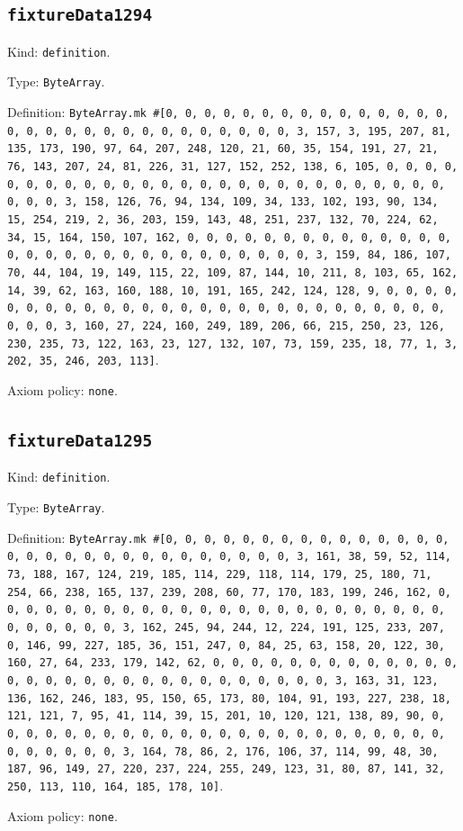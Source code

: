 \documentclass[11pt]{article}
\begin{document}
\subsection*{\texttt{fixtureData1294}}
\noindent Kind: \texttt{definition}.\par
\noindent Type: \texttt{ByteArray}.\par
\noindent Definition: \texttt{ByteArray.mk \#[0, 0, 0, 0, 0, 0, 0, 0, 0, 0, 0, 0, 0, 0, 0, 0, 0, 0, 0, 0, 0, 0, 0, 0, 0, 0, 0, 0, 0, 0, 3, 157, 3, 195, 207, 81, 135, 173, 190, 97, 64, 207, 248, 120, 21, 60, 35, 154, 191, 27, 21, 76, 143, 207, 24, 81, 226, 31, 127, 152, 252, 138, 6, 105, 0, 0, 0, 0, 0, 0, 0, 0, 0, 0, 0, 0, 0, 0, 0, 0, 0, 0, 0, 0, 0, 0, 0, 0, 0, 0, 0, 0, 0, 0, 3, 158, 126, 76, 94, 134, 109, 34, 133, 102, 193, 90, 134, 15, 254, 219, 2, 36, 203, 159, 143, 48, 251, 237, 132, 70, 224, 62, 34, 15, 164, 150, 107, 162, 0, 0, 0, 0, 0, 0, 0, 0, 0, 0, 0, 0, 0, 0, 0, 0, 0, 0, 0, 0, 0, 0, 0, 0, 0, 0, 0, 0, 0, 0, 3, 159, 84, 186, 107, 70, 44, 104, 19, 149, 115, 22, 109, 87, 144, 10, 211, 8, 103, 65, 162, 14, 39, 62, 163, 160, 188, 10, 191, 165, 242, 124, 128, 9, 0, 0, 0, 0, 0, 0, 0, 0, 0, 0, 0, 0, 0, 0, 0, 0, 0, 0, 0, 0, 0, 0, 0, 0, 0, 0, 0, 0, 0, 0, 3, 160, 27, 224, 160, 249, 189, 206, 66, 215, 250, 23, 126, 230, 235, 73, 122, 163, 23, 127, 132, 107, 73, 159, 235, 18, 77, 1, 3, 202, 35, 246, 203, 113]}.\par
\noindent Axiom policy: \texttt{none}.\par
\subsection*{\texttt{fixtureData1295}}
\noindent Kind: \texttt{definition}.\par
\noindent Type: \texttt{ByteArray}.\par
\noindent Definition: \texttt{ByteArray.mk \#[0, 0, 0, 0, 0, 0, 0, 0, 0, 0, 0, 0, 0, 0, 0, 0, 0, 0, 0, 0, 0, 0, 0, 0, 0, 0, 0, 0, 0, 0, 3, 161, 38, 59, 52, 114, 73, 188, 167, 124, 219, 185, 114, 229, 118, 114, 179, 25, 180, 71, 254, 66, 238, 165, 137, 239, 208, 60, 77, 170, 183, 199, 246, 162, 0, 0, 0, 0, 0, 0, 0, 0, 0, 0, 0, 0, 0, 0, 0, 0, 0, 0, 0, 0, 0, 0, 0, 0, 0, 0, 0, 0, 0, 0, 3, 162, 245, 94, 244, 12, 224, 191, 125, 233, 207, 0, 146, 99, 227, 185, 36, 151, 247, 0, 84, 25, 63, 158, 20, 122, 30, 160, 27, 64, 233, 179, 142, 62, 0, 0, 0, 0, 0, 0, 0, 0, 0, 0, 0, 0, 0, 0, 0, 0, 0, 0, 0, 0, 0, 0, 0, 0, 0, 0, 0, 0, 0, 0, 3, 163, 31, 123, 136, 162, 246, 183, 95, 150, 65, 173, 80, 104, 91, 193, 227, 238, 18, 121, 121, 7, 95, 41, 114, 39, 15, 201, 10, 120, 121, 138, 89, 90, 0, 0, 0, 0, 0, 0, 0, 0, 0, 0, 0, 0, 0, 0, 0, 0, 0, 0, 0, 0, 0, 0, 0, 0, 0, 0, 0, 0, 0, 0, 3, 164, 78, 86, 2, 176, 106, 37, 114, 99, 48, 30, 187, 96, 149, 27, 220, 237, 224, 255, 249, 123, 31, 80, 87, 141, 32, 250, 113, 110, 164, 185, 178, 10]}.\par
\noindent Axiom policy: \texttt{none}.\par
\end{document}
